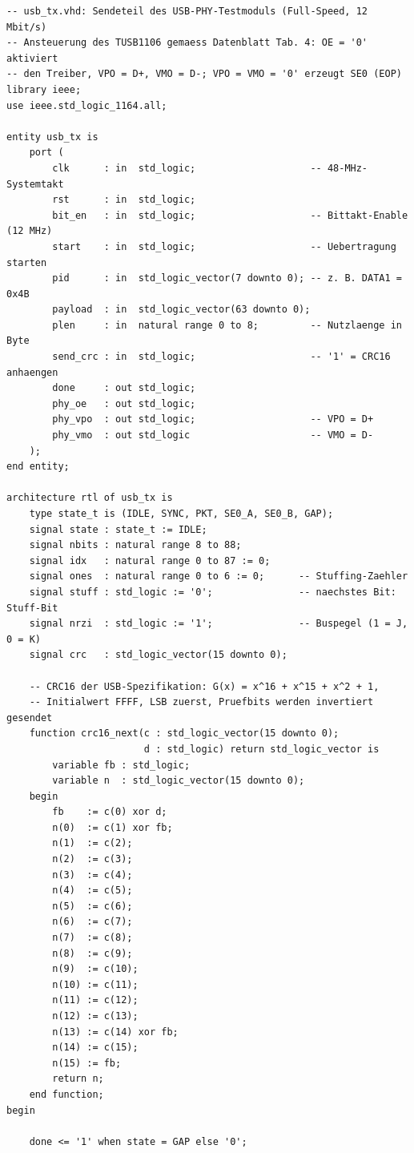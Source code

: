 \documentclass[a4paper,11pt]{article}
\begin{document}
\begin{verbatim}
-- usb_tx.vhd: Sendeteil des USB-PHY-Testmoduls (Full-Speed, 12 Mbit/s)
-- Ansteuerung des TUSB1106 gemaess Datenblatt Tab. 4: OE = '0' aktiviert
-- den Treiber, VPO = D+, VMO = D-; VPO = VMO = '0' erzeugt SE0 (EOP)
library ieee;
use ieee.std_logic_1164.all;

entity usb_tx is
    port (
        clk      : in  std_logic;                    -- 48-MHz-Systemtakt
        rst      : in  std_logic;
        bit_en   : in  std_logic;                    -- Bittakt-Enable (12 MHz)
        start    : in  std_logic;                    -- Uebertragung starten
        pid      : in  std_logic_vector(7 downto 0); -- z. B. DATA1 = 0x4B
        payload  : in  std_logic_vector(63 downto 0);
        plen     : in  natural range 0 to 8;         -- Nutzlaenge in Byte
        send_crc : in  std_logic;                    -- '1' = CRC16 anhaengen
        done     : out std_logic;
        phy_oe   : out std_logic;
        phy_vpo  : out std_logic;                    -- VPO = D+
        phy_vmo  : out std_logic                     -- VMO = D-
    );
end entity;

architecture rtl of usb_tx is
    type state_t is (IDLE, SYNC, PKT, SE0_A, SE0_B, GAP);
    signal state : state_t := IDLE;
    signal nbits : natural range 8 to 88;
    signal idx   : natural range 0 to 87 := 0;
    signal ones  : natural range 0 to 6 := 0;      -- Stuffing-Zaehler
    signal stuff : std_logic := '0';               -- naechstes Bit: Stuff-Bit
    signal nrzi  : std_logic := '1';               -- Buspegel (1 = J, 0 = K)
    signal crc   : std_logic_vector(15 downto 0);

    -- CRC16 der USB-Spezifikation: G(x) = x^16 + x^15 + x^2 + 1,
    -- Initialwert FFFF, LSB zuerst, Pruefbits werden invertiert gesendet
    function crc16_next(c : std_logic_vector(15 downto 0);
                        d : std_logic) return std_logic_vector is
        variable fb : std_logic;
        variable n  : std_logic_vector(15 downto 0);
    begin
        fb    := c(0) xor d;
        n(0)  := c(1) xor fb;
        n(1)  := c(2);
        n(2)  := c(3);
        n(3)  := c(4);
        n(4)  := c(5);
        n(5)  := c(6);
        n(6)  := c(7);
        n(7)  := c(8);
        n(8)  := c(9);
        n(9)  := c(10);
        n(10) := c(11);
        n(11) := c(12);
        n(12) := c(13);
        n(13) := c(14) xor fb;
        n(14) := c(15);
        n(15) := fb;
        return n;
    end function;
begin

    done <= '1' when state = GAP else '0';


\end{verbatim}
\end{document}
